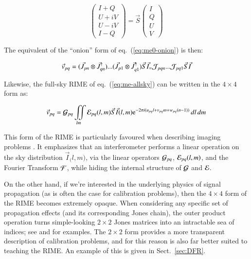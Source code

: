 \documentclass[]{aa}
\newcommand{\jones}[2]{\vec {#1}_{#2}}
\newcommand{\jonesT}[2]{\vec {#1}^\dagger_{#2}}
\begin{document}
\[
\left ( \begin{array}{c}
I+Q \\ U+iV \\ U-iV \\ I-Q
\end{array} \right ) 
= \jones{S}{} 
\left ( \begin{array}{c}
I \\ Q \\ U \\ V
\end{array} \right ) 
\]

The equivalent of the ``onion'' form of eq.~(\ref{eq:me0-onion}) is then:

    \begin{equation}\label{eq:me:mueller-onion}
    \vec v_{pq} = ( \jones{J}{pn} \otimes \jonesT{J}{qn} ) ... ( \jones{J}{p1} \otimes \jonesT{J}{q1} ) \jones{S}{} \jones{I}
= {\cal J}_{pqn} ...  {\cal J}_{pq1} \jones{S}{} \jones{I}{}
    \end{equation}


Likewise, the full-sky RIME of eq.~(\ref{eq:me-allsky}) can be written in the $4\times4$ form as:

    \begin{equation}\label{eq:allsky:mueller}
\vec v_{pq} = {\cal G}_{pq} \iint\limits_{lm} {\cal E}_{pq}(l,m) \jones{S}{} \jones{I}{}(l,m) {\rm e}^{-2\pi i(u_{pq} l+v_{pq} m+w_{pq} (n-1))} \,dl\,dm 
    \end{equation}

This form of the RIME is particularly favoured when describing imaging problems \citep{SB:imageplane,Rau:DDEs}. It emphasizes that an interferometer performs a linear operation on the sky distribution $\jones{I}(l,m)$, via the linear operators ${\cal G}_{pq}$, ${\cal E}_{pq}(l,m)$, and the Fourier Transform $\cal F$, while hiding the internal structure of ${\cal G}$ and ${\cal E}$.

On the other hand, if we're interested in the underlying physics of signal propagation (as is often the case for calibration problems), then the $4\times4$ form of the RIME becomes extremely opaque. When considering any specific set of propagation effects (and its corresponding Jones chain), the outer product operation turns simple-looking $2\times2$ Jones matrices into an intractable sea of indices; see \citet[eq. 4]{SB:imageplane} and \citet[Appendix A]{ME1} for examples. The $2\times2$ form provides a more transparent description of calibration problems, and for this reason is also far better suited to teaching the RIME. An example of this is given in Sect.~\ref{sec:DFR}.
\end{document}
